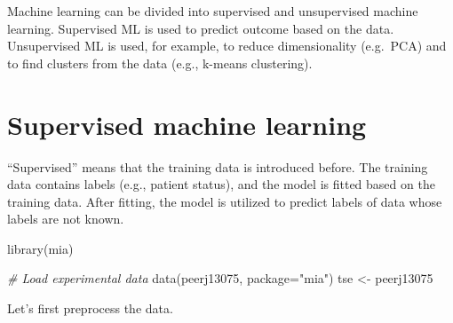 \documentclass[
]{book}
\newenvironment{Shaded}{\begin{snugshade}}{\end{snugshade}}
\newcommand{\AttributeTok}[1]{\textcolor[rgb]{0.77,0.63,0.00}{#1}}
\newcommand{\CommentTok}[1]{\textcolor[rgb]{0.56,0.35,0.01}{\textit{#1}}}
\newcommand{\DecValTok}[1]{\textcolor[rgb]{0.00,0.00,0.81}{#1}}
\newcommand{\FunctionTok}[1]{\textcolor[rgb]{0.00,0.00,0.00}{#1}}
\newcommand{\NormalTok}[1]{#1}
\newcommand{\OtherTok}[1]{\textcolor[rgb]{0.56,0.35,0.01}{#1}}
\newcommand{\SpecialCharTok}[1]{\textcolor[rgb]{0.00,0.00,0.00}{#1}}
\newcommand{\StringTok}[1]{\textcolor[rgb]{0.31,0.60,0.02}{#1}}
\begin{document}
Machine learning can be divided into supervised and unsupervised machine learning.
Supervised ML is used to predict outcome based on the data. Unsupervised ML is used,
for example, to reduce dimensionality (e.g.~PCA) and to find clusters from the
data (e.g., k-means clustering).

\hypertarget{supervised-machine-learning}{%
\section{Supervised machine learning}\label{supervised-machine-learning}}

``Supervised'' means that the training data is introduced before. The training data
contains labels (e.g., patient status), and the model is fitted based on the
training data. After fitting, the model is utilized to predict labels of data whose
labels are not known.

\begin{Shaded}
\begin{Highlighting}[]
\FunctionTok{library}\NormalTok{(mia)}

\CommentTok{\# Load experimental data}
\FunctionTok{data}\NormalTok{(peerj13075, }\AttributeTok{package=}\StringTok{"mia"}\NormalTok{)}
\NormalTok{tse }\OtherTok{\textless{}{-}}\NormalTok{ peerj13075}
\end{Highlighting}
\end{Shaded}

Let's first preprocess the data.

\begin{Shaded}
\end{Shaded}
\end{document}
